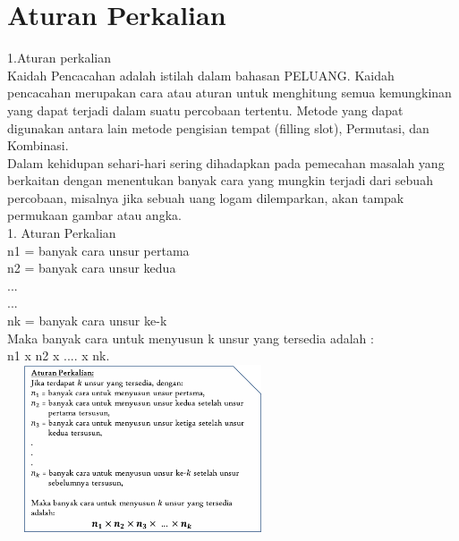 \documentclass[11pt,fleqn]{book} %
\begin{document}


\section{Aturan Perkalian}



1.Aturan perkalian\\

	Kaidah Pencacahan adalah istilah dalam bahasan PELUANG. Kaidah pencacahan merupakan cara atau aturan untuk menghitung semua kemungkinan yang dapat terjadi dalam suatu percobaan tertentu. Metode yang dapat digunakan antara lain metode pengisian tempat (filling slot), Permutasi, dan Kombinasi.\\ 

	Dalam kehidupan sehari-hari sering dihadapkan pada pemecahan masalah yang berkaitan dengan menentukan banyak cara yang mungkin terjadi dari sebuah percobaan, misalnya jika sebuah uang logam dilemparkan, akan tampak permukaan gambar atau angka.\\ 



1. Aturan Perkalian\\

n1 = banyak cara unsur pertama\\

n2 = banyak cara unsur kedua\\

...\\

...\\

nk = banyak cara unsur ke-k\\

Maka banyak cara untuk menyusun k unsur yang tersedia adalah :\\

n1 x n2 x .... x nk.\\



\includegraphics[width = 8cm, height= 5cm]{Pictures/materikaidah1.png}\\
\end{document}
